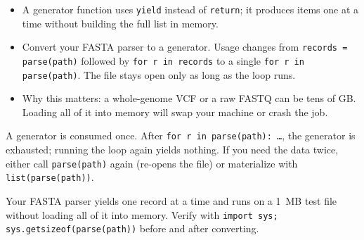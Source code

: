 \begin{itemize}[nosep]
  \item A generator function uses \texttt{yield} instead of \texttt{return}; it produces items one at a time without building the full list in memory.
  \item Convert your FASTA parser to a generator. Usage changes from \texttt{records = parse(path)} followed by \texttt{for r in records} to a single \texttt{for r in parse(path)}. The file stays open only as long as the loop runs.
  \item Why this matters: a whole-genome VCF or a raw FASTQ can be tens of GB. Loading all of it into memory will swap your machine or crash the job.
\end{itemize}
\begin{tipbox}
A generator is consumed once. After \texttt{for r in parse(path): \ldots}, the generator is exhausted; running the loop again yields nothing. If you need the data twice, either call \texttt{parse(path)} again (re-opens the file) or materialize with \texttt{list(parse(path))}.
\end{tipbox}
\begin{winbox}[Checkpoint]
Your FASTA parser yields one record at a time and runs on a 1~MB test file without loading all of it into memory. Verify with \texttt{import sys; sys.getsizeof(parse(path))} before and after converting.
\end{winbox}

